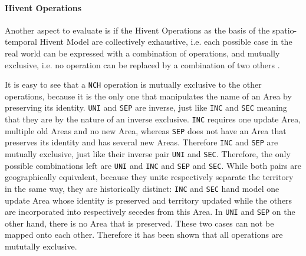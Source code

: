 
\paragraph{Hivent Operations} %
\label{par:hivent_operations}

Another aspect to evaluate is if the Hivent Operations as the basis of the spatio-temporal Hivent Model are collectively exhaustive, i.e. each possible case in the real world can be expressed with a combination of operations, and mutually exclusive, i.e. no operation can be replaced by a combination of two others \cite{mece}.

It is easy to see that a \texttt{NCH} operation is mutually exclusive to the other operations, because it is the only one that manipulates the name of an Area by preserving its identity. \texttt{UNI} and \texttt{SEP} are inverse, just like \texttt{INC} and \texttt{SEC} meaning that they are by the nature of an inverse exclusive. \texttt{INC} requires one update Area, multiple old Areas and no new Area, whereas \texttt{SEP} does not have an Area that preserves its identity and has several new Areas. Therefore \texttt{INC} and \texttt{SEP} are mutually exclusive, just like their inverse pair \texttt{UNI} and \texttt{SEC}.
Therefore, the only possible combinations left are \texttt{UNI} and \texttt{INC} and \texttt{SEP} and \texttt{SEC}. While both pairs are geographically equivalent, because they unite respectively separate the territory in the same way, they are historically distinct: \texttt{INC} and \texttt{SEC} hand model one update Area whose identity is preserved and territory updated while the others are incorporated into respectively secedes from this Area. In \texttt{UNI} and \texttt{SEP} on the other hand, there is no Area that is preserved. These two cases can not be mapped onto each other. Therefore it has been shown that all operations are mututally exclusive.


